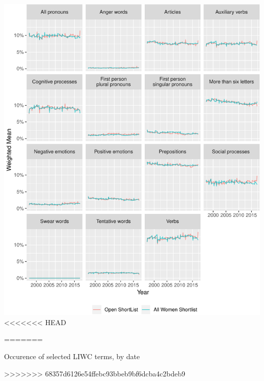 \documentclass[]{article}
\let\origfigure\figure
\let\endorigfigure\endfigure
\renewenvironment{figure}[1][2] {
    \expandafter\origfigure\expandafter[H]
} {
    \endorigfigure
}
\theoremstyle{definition}
\theoremstyle{definition}
\theoremstyle{definition}
\theoremstyle{remark}
\begin{document}
\begin{table}[H]
\begin{table}[H]
\begin{table}[H]
\begin{figure}
\centering
\includegraphics{methodology_files/figure-latex/sl-key-date-1.pdf}
<<<<<<< HEAD
\caption{\label{fig:sl-key-date}Occurrence of selected LIWC terms, by date}
\end{figure}

\begin{table}[H]
=======
\caption{\label{sl-key-date}Occurence of selected LIWC terms, by date}
\end{figure}

\begin{table}
>>>>>>> 68357d6126e54ffebc93bbeb9bf6dcba4c2bdeb9


\end{table}
\end{table}
\end{table}
\end{table}
\end{table}
\end{document}
